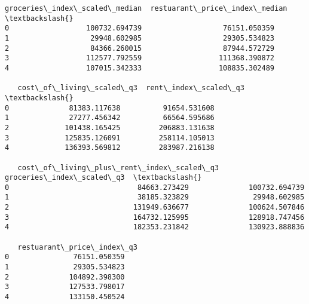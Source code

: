 \documentclass[11pt]{article}
\begin{document}
\begin{Verbatim}[commandchars=\\\{\}]
   groceries\_index\_scaled\_median  restuarant\_price\_index\_median  \textbackslash{}
0                  100732.694739                   76151.050359
1                   29948.602985                   29305.534823
2                   84366.260015                   87944.572729
3                  112577.792559                  111368.390872
4                  107015.342333                  108835.302489

   cost\_of\_living\_scaled\_q3  rent\_index\_scaled\_q3  \textbackslash{}
0              81383.117638          91654.531608
1              27277.456342          66564.595686
2             101438.165425         206883.131638
3             125835.126091         258114.105013
4             136393.569812         283987.216138

   cost\_of\_living\_plus\_rent\_index\_scaled\_q3  groceries\_index\_scaled\_q3  \textbackslash{}
0                              84663.273429              100732.694739
1                              38185.323829               29948.602985
2                             131949.636677              100624.507846
3                             164732.125995              128918.747456
4                             182353.231842              130923.888836

   restuarant\_price\_index\_q3
0               76151.050359
1               29305.534823
2              104892.398300
3              127533.798017
4              133150.450524
    \end{Verbatim}
\end{document}
